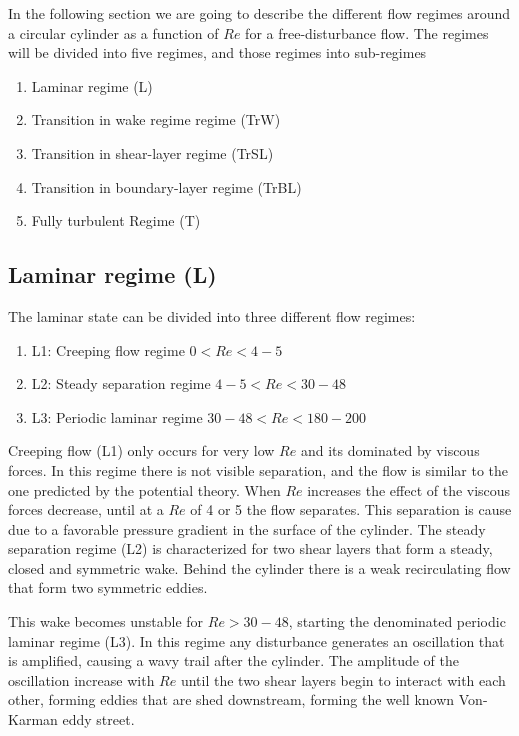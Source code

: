 \documentclass[journal]{new-aiaa}
\begin{document}
In the following section we are going to describe the different flow regimes around a circular cylinder as a function of $Re$ for a free-disturbance flow. The regimes will be divided into five regimes, and those regimes into sub-regimes

\begin{enumerate}[label=(\roman*)]
\item Laminar regime (L)
\item Transition in wake regime regime (TrW)
\item Transition in shear-layer regime (TrSL)
\item Transition in boundary-layer regime (TrBL)
\item Fully turbulent Regime (T)
\end{enumerate}

\subsection{Laminar regime (L)}

The laminar state can be divided into three different flow regimes:

\begin{enumerate}[label=(\roman*)]
\item L1: Creeping flow regime  $0<Re<4-5$
\item L2: Steady separation regime $4-5<Re<30-48$
\item L3: Periodic laminar regime $30-48<Re<180-200$
\end{enumerate}

Creeping flow (L1) only occurs for very low $Re$ and its dominated by viscous forces. In this regime there is not visible separation, and the flow is similar to the one predicted by the potential theory.  When  $Re$ increases the effect of the viscous forces decrease, until at a $Re$ of 4 or 5 the flow separates. This separation is cause due to a favorable pressure gradient in the surface of the cylinder. The steady separation regime (L2) is characterized for two shear layers that form a steady, closed and symmetric wake. Behind the cylinder there is a weak recirculating flow that form two symmetric eddies.

This wake becomes unstable for $Re > 30-48$, starting the denominated periodic laminar regime (L3). In this regime any disturbance generates an oscillation that is amplified, causing a wavy trail after the cylinder. The amplitude of the oscillation increase with $Re$ until the two shear layers begin to interact with each other, forming eddies that are shed downstream, forming the well known Von-Karman eddy street.
\end{document}
